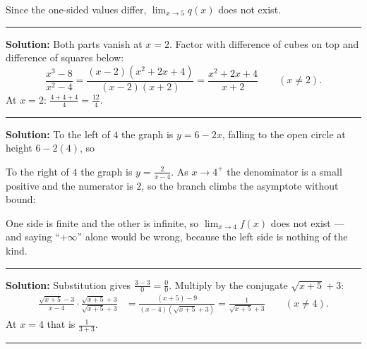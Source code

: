 \documentclass[12pt]{article}
\begin{document}
Since the one-sided values differ, $\lim_{x\to5} q(x)$ does not exist.

\vspace{0.2cm}\noindent\rule{\linewidth}{0.2pt}\vspace{0.2cm}


\textbf{Solution:} Both parts vanish at $x = 2$. Factor with difference of
cubes on top and difference of squares below:
\[
  \frac{x^3-8}{x^2-4} = \frac{(x-2)\left(x^2+2x+4\right)}{(x-2)(x+2)}
  = \frac{x^2+2x+4}{x+2} \qquad (x \neq 2).
\]
At $x = 2$: $\frac{4+4+4}{4} = \frac{12}{4}$. 

\vspace{0.2cm}\noindent\rule{\linewidth}{0.2pt}\vspace{0.2cm}


\textbf{Solution:} To the left of $4$ the graph is $y = 6-2x$, falling to the
open circle at height $6 - 2(4)$, so 

To the right of $4$ the graph is $y = \frac{2}{x-4}$. As $x \to 4^+$ the
denominator is a small positive and the numerator is $2$, so the branch climbs
the asymptote without bound: \ans{+\infty}

One side is finite and the other is infinite, so $\lim_{x\to4} f(x)$ does not
exist --- and saying ``$+\infty$'' alone would be wrong, because the left side
is nothing of the kind.

\vspace{0.2cm}\noindent\rule{\linewidth}{0.2pt}\vspace{0.2cm}


\textbf{Solution:} Substitution gives $\frac{3-3}{0} = \frac{0}{0}$. Multiply by
the conjugate $\sqrt{x+5}+3$:
\begin{align*}
  \frac{\sqrt{x+5}-3}{x-4}\cdot\frac{\sqrt{x+5}+3}{\sqrt{x+5}+3}
    &= \frac{(x+5)-9}{(x-4)\left(\sqrt{x+5}+3\right)}
     = \frac{1}{\sqrt{x+5}+3} \qquad (x \neq 4).
\end{align*}
At $x = 4$ that is $\frac{1}{3+3}$. 

\vspace{0.2cm}\noindent\rule{\linewidth}{0.2pt}\vspace{0.2cm}
\end{document}
